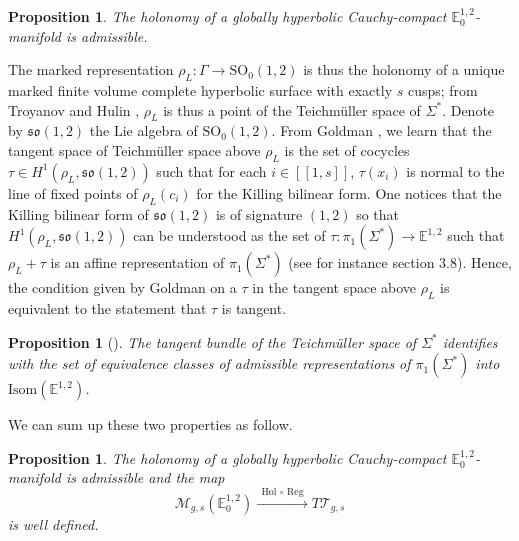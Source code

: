 \documentclass[a4paper,12pt]{article}
\def\M{\mathcal{M}}
\def\GG{\SO_0(1,2)}
\def\isom{Isom}
\def\lsem{[\![}
\def\rsem{]\!]}
\def\T{\mathcal{T}}
\def\SO{\mathrm{SO}}
\newcommand{\mass}[1]{{\mathbb E}^{1,2}_{#1}}
\def\isom{\mathrm{Isom}}
\def\Reg{\mathrm{Reg}}
\newtheorem{propou}[lemou]{Proposition}
\begin{document}
 \begin{propou}  
The holonomy of a globally hyperbolic Cauchy-compact $\mass{0}$-mani\-fold is admissible.
 \end{propou}
 
 
 
  The marked representation $\rho_L : \Gamma\rightarrow \GG$ is thus the holonomy of a unique marked finite volume complete hyperbolic surface with exactly $s$ cusps; from Troyanov and Hulin \cite{MR1166122}, $\rho_L$ is thus a point of the Teichmüller space of $\Sigma^*$.
Denote by $\mathfrak{so}(1,2)$  the Lie algebra of $\mathrm{SO}_0(1,2)$.
From Goldman \cite{MR762512}, we learn that the tangent space  of Teichmüller space above $\rho_L$ is the set of cocycles $\tau\in H^1(\rho_L,\mathfrak{so}(1,2))$ 
such that for each $i\in \lsem 1,s\rsem$, $\tau(x_i)$ is normal to the line of fixed points of $\rho_L(c_i)$ for the Killing bilinear form.
 One notices  that the Killing bilinear form of $\mathfrak{so}(1,2)$ is of signature $(1,2)$ so that $H^1(\rho_L,\mathfrak{so}(1,2))$ can be understood as the set of $\tau:
 \pi_1(\Sigma^*)\rightarrow \mass{}$ such that $\rho_L+\tau$ is an affine representation  of $\pi_1(\Sigma^*)$ (see for instance \cite{MR2499272} section 3.8). Hence, the condition given by Goldman on a $\tau$ in the tangent space above $\rho_L$  is equivalent to the statement that $\tau$ is tangent. 

\begin{propou}[\cite{MR762512,MR1166122}]
 The tangent bundle of the Teichmüller space of $\Sigma^*$ identifies with the set of equivalence classes of admissible representations of $\pi_1(\Sigma^*)$ into $\isom(\mass{})$.
\end{propou} 

We can sum up these two properties as follow.

\begin{propou}  \label{prop:hol_map}
The holonomy of a globally hyperbolic Cauchy-compact $\mass{0}$-manifold is admissible and
 the map 
$$ \M_{g,s}(\mass{0})\xrightarrow{~~\mathrm{Hol}\,\circ\, \Reg~~} T\T_{g,s}$$ is well defined.
\end{propou}
\end{document}
